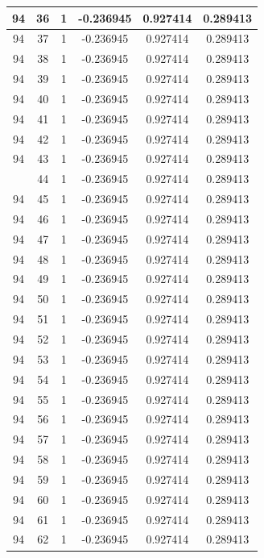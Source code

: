 \documentclass[12pt,a4paper]{article}
\numberwithin{equation}{section}
\numberwithin{figure}{section}
\numberwithin{table}{section}
\begin{document}
\begin{longtable}{|c|c|c|c|c|c|}
94 & 36 & 1 & -0.236945 & 0.927414 & 0.289413 \\ \hline
94 & 37 & 1 & -0.236945 & 0.927414 & 0.289413 \\ \hline
94 & 38 & 1 & -0.236945 & 0.927414 & 0.289413 \\ \hline
94 & 39 & 1 & -0.236945 & 0.927414 & 0.289413 \\ \hline
94 & 40 & 1 & -0.236945 & 0.927414 & 0.289413 \\ \hline
94 & 41 & 1 & -0.236945 & 0.927414 & 0.289413 \\ \hline
94 & 42 & 1 & -0.236945 & 0.927414 & 0.289413 \\ \hline
94 & 43 & 1 & -0.236945 & 0.927414 & 0.289413 \\ \hline
\pagebreak
94 & 44 & 1 & -0.236945 & 0.927414 & 0.289413 \\ \hline
94 & 45 & 1 & -0.236945 & 0.927414 & 0.289413 \\ \hline
94 & 46 & 1 & -0.236945 & 0.927414 & 0.289413 \\ \hline
94 & 47 & 1 & -0.236945 & 0.927414 & 0.289413 \\ \hline
94 & 48 & 1 & -0.236945 & 0.927414 & 0.289413 \\ \hline
94 & 49 & 1 & -0.236945 & 0.927414 & 0.289413 \\ \hline
94 & 50 & 1 & -0.236945 & 0.927414 & 0.289413 \\ \hline
94 & 51 & 1 & -0.236945 & 0.927414 & 0.289413 \\ \hline
94 & 52 & 1 & -0.236945 & 0.927414 & 0.289413 \\ \hline
94 & 53 & 1 & -0.236945 & 0.927414 & 0.289413 \\ \hline
94 & 54 & 1 & -0.236945 & 0.927414 & 0.289413 \\ \hline
94 & 55 & 1 & -0.236945 & 0.927414 & 0.289413 \\ \hline
94 & 56 & 1 & -0.236945 & 0.927414 & 0.289413 \\ \hline
94 & 57 & 1 & -0.236945 & 0.927414 & 0.289413 \\ \hline
94 & 58 & 1 & -0.236945 & 0.927414 & 0.289413 \\ \hline
94 & 59 & 1 & -0.236945 & 0.927414 & 0.289413 \\ \hline
94 & 60 & 1 & -0.236945 & 0.927414 & 0.289413 \\ \hline
94 & 61 & 1 & -0.236945 & 0.927414 & 0.289413 \\ \hline
94 & 62 & 1 & -0.236945 & 0.927414 & 0.289413 \\ \hline

\end{longtable}
\end{document}
